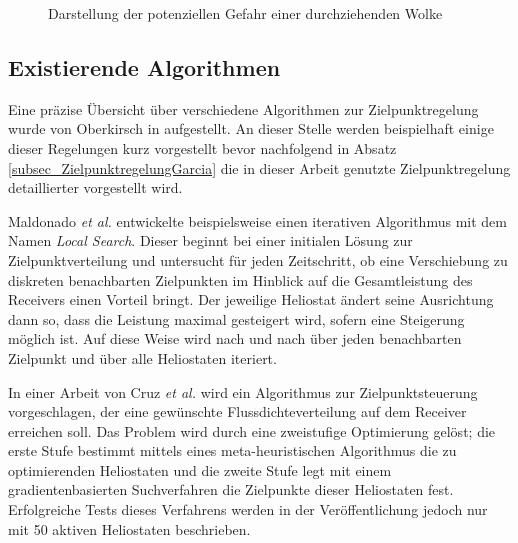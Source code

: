 \enlargethispage*{\baselineskip}
\begin{figure}[h!]
    \centering
    \setlength{\fboxsep}{1pt}
    \setlength{\fboxrule}{1pt}
    \caption[Darstellung der potenziellen Gefahr einer durchziehenden Wolke]{Darstellung der potenziellen Gefahr einer durchziehenden Wolke}
    \label{fig_EinflussWolke}
\end{figure}

\subsection{Existierende Algorithmen} \label{subsec_ZielpunktregelungLiteratur}
Eine präzise Übersicht über verschiedene Algorithmen zur Zielpunktregelung wurde von Oberkirsch in \cite{DissOberkirsch} aufgestellt.
An dieser Stelle werden beispielhaft einige dieser Regelungen kurz vorgestellt bevor nachfolgend in Absatz \ref{subsec_ZielpunktregelungGarcia} die in dieser Arbeit genutzte Zielpunktregelung detaillierter vorgestellt wird.

Maldonado \textit{et al.} \cite{Maldonado}\cite{Maldonado2} entwickelte beispielsweise einen iterativen Algorithmus mit dem Namen \textit{Local Search}.
Dieser beginnt bei einer initialen Lösung zur Zielpunktverteilung und untersucht für jeden Zeitschritt, ob eine Verschiebung zu diskreten benachbarten Zielpunkten im Hinblick auf die Gesamtleistung des Receivers einen Vorteil bringt.
Der jeweilige Heliostat ändert seine Ausrichtung dann so, dass die Leistung maximal gesteigert wird, sofern eine Steigerung möglich ist.
Auf diese Weise wird nach und nach über jeden benachbarten Zielpunkt und über alle Heliostaten iteriert.

In einer Arbeit von Cruz \textit{et al.} \cite{Cruz} wird ein Algorithmus zur Zielpunktsteuerung vorgeschlagen, der eine gewünschte Flussdichteverteilung auf dem Receiver erreichen soll.
Das Problem wird durch eine zweistufige Optimierung gelöst; die erste Stufe bestimmt mittels eines meta-heuristischen Algorithmus die zu optimierenden Heliostaten und die zweite Stufe legt mit einem gradientenbasierten Suchverfahren die Zielpunkte dieser Heliostaten fest. Erfolgreiche Tests dieses Verfahrens werden in der Veröffentlichung jedoch nur mit 50 aktiven Heliostaten beschrieben.


